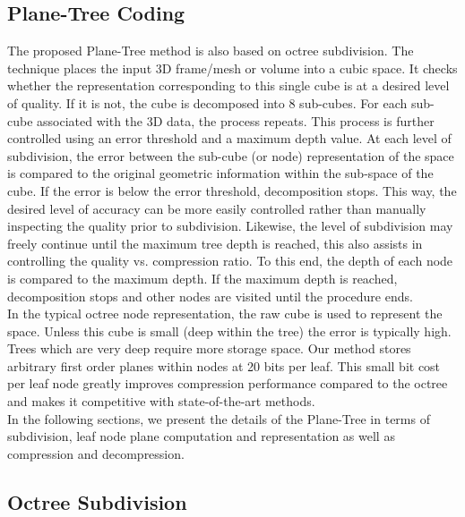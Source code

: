 \subsection{Plane-Tree Coding}
\label{sec:pt_ptcoding}

The proposed Plane-Tree method is also based on octree subdivision. The technique places the input 3D frame/mesh or volume into a cubic space. It checks whether the representation corresponding to this single cube is at a desired level of quality. If it is not, the cube is decomposed into 8 sub-cubes. For each sub-cube associated with the 3D data, the process repeats. This process is further controlled using an error threshold and a maximum depth value. At each level of subdivision, the error between the sub-cube (or node) representation of the space is compared to the original geometric information within the sub-space of the cube. If the error is below the error threshold, decomposition stops. This way, the desired level of accuracy can be more easily controlled rather than manually inspecting the quality prior to subdivision. Likewise, the level of subdivision may freely continue until the maximum tree depth is reached, this also assists in controlling the quality vs. compression ratio. To this end, the depth of each node is compared to the maximum depth. If the maximum depth is reached, decomposition stops and other nodes are visited until the procedure ends. \\

In the typical octree node representation, the raw cube is used to represent the space. Unless this cube is small (deep within the tree) the error is typically high. Trees which are very deep require more storage space. Our method stores arbitrary first order planes within nodes at 20 bits per leaf. This small bit cost per leaf node greatly improves compression performance compared to the octree and makes it competitive with state-of-the-art methods. \\

 
In the following sections, we present the details of the Plane-Tree in terms of subdivision, leaf node plane computation and representation as well as compression and decompression. \\


\subsection{Octree Subdivision}
\label{sec:pt_ptsubdiv}

